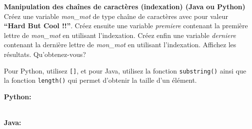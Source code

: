 \begin{Exercice}[5 minutes] \textbf{Manipulation des chaînes de caractères (indexation) (Java ou Python)}\\
   Créez une variable \textit{mon\_mot} de type chaîne de caractères avec pour valeur \textbf{``Hard But Cool !!''}. Créez ensuite une variable \textit{premiere} contenant la première lettre de \textit{mon\_mot} en utilisant l'indexation. Créez enfin une variable \textit{derniere} contenant la dernière lettre de \textit{mon\_mot} en utilisant l'indexation. Affichez les résultats. Qu'obtenez-vous? \\
   
    \begin{conseil}
      	Pour Python, utilisez \lstinline{[]}, et pour Java, utilisez la fonction \lstinline{substring()} ainsi que la fonction \lstinline{length()} qui permet d'obtenir la taille d'un élément.
        
    \end{conseil}
    \begin{solution}
    
    \textbf{Python:}
    
    
    \textbf{\\Java:}
    
           
    \end{solution}   
\end{Exercice}


